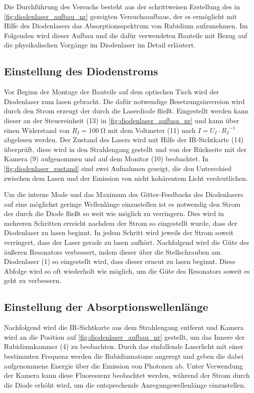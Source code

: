 
Die Durchführung des Versuchs besteht aus der schrittweisen Erstellung des in \cref{fig:diodenlaser_aufbau_nr}
gezeigten Versuchsaufbaus, der es ermöglicht mit Hilfe des Diodenlasers das Absorptionsspektrum
von Rubidium aufzunehmen. Im Folgenden wird dieser Aufbau und die dafür verwendeten Bauteile 
mit Bezug auf die physikalischen Vorgänge im Diodenlaser im Detail erläutert.



\subsection{Einstellung des Diodenstroms} \label{sec:einstellung_diodenstrom}
Vor Beginn der Montage der Bauteile auf dem optischen Tisch wird der Diodenlaser zum lasen gebracht.
Die dafür notwendige Besetzungsinversion wird durch den Strom erzeugt der durch die Laserdiode 
fließt. Eingestellt werden kann dieser an der Steuereinheit (13) in \cref{fig:diodenlaser_aufbau_nr} und
kann über einen Widerstand von $R_{I} = \SI{100}{\ohm}$ mit dem Voltmeter (11) nach
$I = U_{I} \cdot {R_{I}}^{-1}$ abgelesen werden. 
Der Zustand des Lasers wird mit Hilfe der IR-Sichtkarte (14) überprüft, diese wird in den Strahlengang 
gestellt und von der Rückseite mit der Kamera (9) aufgenommen und auf dem Monitor (10) beobachtet.
In \cref{fig:diodenlaser_zustand} sind zwei Aufnahmen gezeigt, die den Unterschied zwischen dem Lasen und der 
Emission von nicht kohärentem Licht verdeutlichen.



Um die interne Mode und das Maximum des Gitter-Feedbacks des Diodenlasers auf eine möglichst 
geringe Wellenlänge einzustellen ist es notwendig den Strom der durch die Diode fließt so weit 
wie möglich zu verringern.
Dies wird in mehreren Schritten erreicht nachdem der Strom so eingestellt wurde, dass 
der Diodenlaser zu lasen beginnt. In jedem Schritt wird jeweils der Strom soweit verringert,
dass der Laser gerade zu lasen aufhört. Nachfolgend wird die Güte des äußeren Resonators verbessert,
indem dieser über die Stellschrauben am Diodenlaser (1) so eingestellt wird, dass dieser erneut zu lasen beginnt. Diese Abfolge wird
so oft wiederholt wie möglich, um die Güte des Resonators soweit es geht zu verbessern. 

\subsection{Einstellung der Absorptionswellenlänge}
Nachfolgend wird die IR-Sichtkarte aus dem Strahlengang entfernt und Kamera wird an die 
Position auf \cref{fig:diodenlaser_aufbau_nr} gestellt, um das Innere der Rubidiumkammer (4)
zu beobachten. Durch das einfallende Laserlicht mit einer bestimmten Frequenz werden 
die Rubidiumatome angeregt und geben die dabei aufgenommene Energie über die Emission von
Photonen ab. Unter Verwendung der Kamera kann diese Fluoreszenz beobachtet werden, während
der Strom durch die Diode erhöht wird, um die entsprechende Anregungswellenlänge einzustellen.


